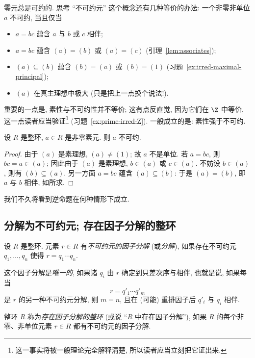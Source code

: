 零元总是可约的. 思考 ``不可约元'' 这个概念还有几种等价的办法: 一个非零非单位 $a$ 不可约, 当且仅当
\begin{itemize}
\item $a = bc$ 蕴含 $a$ 与 $b$ 或 $c$ 相伴;
\item $a = bc$ 蕴含 $(a) = (b)$ 或 $(a) = (c)$ (引理~\ref{lem:associates});
\item $(a)\subseteq (b)$ 蕴含 $(b) = (a)$ 或 $(b) = (1)$ (习题~\ref{ex:irred-maximal-principal});
\item $(a)$ 在真主理想中极大 (只是把上一点换个说法!).
\end{itemize}

重要的一点是, 素性与不可约性并不等价; 这有点反直觉, 因为它们在 $\Z$ 中等价, 这一点读者应当验证\footnote{这一事实将被一般理论完全解释清楚, 所以读者应当立刻把它证出来.} (习题~\ref{ex:prime-irred-Z}). 一般成立的是: 素性强于不可约.

\begin{lemma}\label{lem:prime-irreducible}
设 $R$ 是整环, $a\in R$ 是非零素元. 则 $a$ 不可约.
\end{lemma}

\begin{proof}
由于 $(a)$ 是素理想, $(a)\neq (1)$; 故 $a$ 不是单位. 若 $a = bc$, 则 $bc = a\in (a)$; 因此由于 $(a)$ 是素理想, $b\in (a)$ 或 $c\in (a)$. 不妨设 $b\in (a)$, 则有 $(b)\subseteq (a)$. 另一方面 $a = bc$ 蕴含 $(a)\subseteq (b)$: 于是 $(a) = (b)$, 即 $a$ 与 $b$ 相伴, 如所求.
\end{proof}

我们不久将看到逆命题在何种情形下成立.

\subsection{分解为不可约元; 存在因子分解的整环}
\label{subsec:factorization-irreducibles}

\begin{definition}\label{def:factorization}
设 $R$ 是整环. 元素 $r\in R$ 有\emph{不可约元的因子分解} (或\emph{分解}), 如果存在不可约元 $q_1,\dots,q_n$ 使得 $r = q_1\cdots q_n$.
\end{definition}

这个因子分解是\emph{唯一的}, 如果诸 $q_i$ 由 $r$ 确定到只差次序与相伴, 也就是说, 如果每当
\[
r = q'_1\cdots q'_m
\]
是 $r$ 的另一种不可约元分解, 则 $m = n$, 且在 (可能) 重排因子后 $q'_i$ 与 $q_i$ 相伴.

\begin{definition}\label{def:domain-factorizations}
整环 $R$ 称为\emph{存在因子分解的整环} (或说 ``$R$ 中存在因子分解''), 如果 $R$ 的每个非零、非单位元素 $r\in R$ 都有不可约元的因子分解.
\end{definition}

